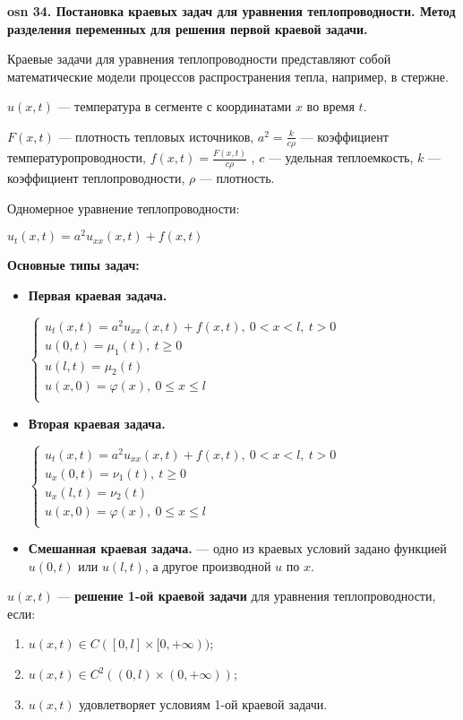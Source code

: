 \textbf{\LARGE osn 34. Постановка краевых задач для уравнения теплопроводности.  Метод разделения переменных для решения первой краевой задачи.}

Краевые задачи для уравнения теплопроводности представляют собой математические модели процессов распространения тепла, например, в стержне.
    
$u(x,t)$ --- температура в сегменте с координатами $x$ во время $t$.

$F(x, t)$ --- плотность тепловых источников, $a^2 = \frac{k}{c\rho}$ --- коэффициент температуропроводности, $f(x,t)=\frac{F(x,t)}{c\rho}$ , $c$ --- удельная теплоемкость, $k$ --- коэффициент теплопроводности, $\rho$ --- плотность.

\bigbreak

Одномерное уравнение теплопроводности:

$u_t(x,t)=a^2u_{xx}(x,t)+f(x,t)$


\textbf{Основные типы задач:}
\begin{itemize}
    \item \textbf{Первая краевая задача.}
    
    $\begin{cases}
    u_t(x,t)=a^2u_{xx}(x,t)+f(x,t),~0<x<l,~t>0&\\
    u(0,t)=\mu_1(t),~t\geqslant0&\\
    u(l,t)=\mu_2(t)&\\
    u(x,0)=\varphi(x),~0\leqslant x\leqslant l&\\
    \end{cases}$
    \item \textbf{Вторая краевая задача.}
    
    $\begin{cases}
    u_t(x,t)=a^2u_{xx}(x,t)+f(x,t),~0<x<l,~t>0&\\
    u_x(0,t)=\nu_1(t),~t\geqslant0&\\
    u_x(l,t)=\nu_2(t)&\\
    u(x,0)=\varphi(x),~0\leqslant x\leqslant l&\\
    \end{cases}$
    \item \textbf{Смешанная краевая задача.} --- одно из краевых условий задано функцией $u(0,t)$ или $u(l,t)$, а другое производной $u$ по $x$.
\end{itemize}

$u(x,t)$ --- \textbf{решение 1-ой краевой задачи} для уравнения теплопроводности, если:
\begin{enumerate}
    \item $u(x,t)\in C([0,l]\times[0,+\infty))$;
    \item $u(x,t)\in C^2((0,l)\times(0,+\infty))$;
    \item $u(x,t)$ удовлетворяет условиям 1-ой краевой задачи.
\end{enumerate}

